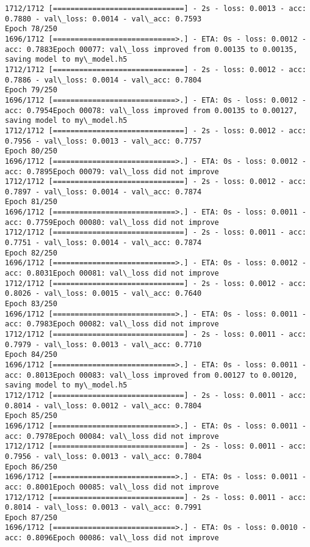 \documentclass[11pt]{article}
\begin{document}
\begin{Verbatim}[commandchars=\\\{\}]
1712/1712 [==============================] - 2s - loss: 0.0013 - acc: 0.7880 - val\_loss: 0.0014 - val\_acc: 0.7593
Epoch 78/250
1696/1712 [============================>.] - ETA: 0s - loss: 0.0012 - acc: 0.7883Epoch 00077: val\_loss improved from 0.00135 to 0.00135, saving model to my\_model.h5
1712/1712 [==============================] - 2s - loss: 0.0012 - acc: 0.7886 - val\_loss: 0.0014 - val\_acc: 0.7804
Epoch 79/250
1696/1712 [============================>.] - ETA: 0s - loss: 0.0012 - acc: 0.7954Epoch 00078: val\_loss improved from 0.00135 to 0.00127, saving model to my\_model.h5
1712/1712 [==============================] - 2s - loss: 0.0012 - acc: 0.7956 - val\_loss: 0.0013 - val\_acc: 0.7757
Epoch 80/250
1696/1712 [============================>.] - ETA: 0s - loss: 0.0012 - acc: 0.7895Epoch 00079: val\_loss did not improve
1712/1712 [==============================] - 2s - loss: 0.0012 - acc: 0.7897 - val\_loss: 0.0014 - val\_acc: 0.7874
Epoch 81/250
1696/1712 [============================>.] - ETA: 0s - loss: 0.0011 - acc: 0.7759Epoch 00080: val\_loss did not improve
1712/1712 [==============================] - 2s - loss: 0.0011 - acc: 0.7751 - val\_loss: 0.0014 - val\_acc: 0.7874
Epoch 82/250
1696/1712 [============================>.] - ETA: 0s - loss: 0.0012 - acc: 0.8031Epoch 00081: val\_loss did not improve
1712/1712 [==============================] - 2s - loss: 0.0012 - acc: 0.8026 - val\_loss: 0.0015 - val\_acc: 0.7640
Epoch 83/250
1696/1712 [============================>.] - ETA: 0s - loss: 0.0011 - acc: 0.7983Epoch 00082: val\_loss did not improve
1712/1712 [==============================] - 2s - loss: 0.0011 - acc: 0.7979 - val\_loss: 0.0013 - val\_acc: 0.7710
Epoch 84/250
1696/1712 [============================>.] - ETA: 0s - loss: 0.0011 - acc: 0.8013Epoch 00083: val\_loss improved from 0.00127 to 0.00120, saving model to my\_model.h5
1712/1712 [==============================] - 2s - loss: 0.0011 - acc: 0.8014 - val\_loss: 0.0012 - val\_acc: 0.7804
Epoch 85/250
1696/1712 [============================>.] - ETA: 0s - loss: 0.0011 - acc: 0.7978Epoch 00084: val\_loss did not improve
1712/1712 [==============================] - 2s - loss: 0.0011 - acc: 0.7956 - val\_loss: 0.0013 - val\_acc: 0.7804
Epoch 86/250
1696/1712 [============================>.] - ETA: 0s - loss: 0.0011 - acc: 0.8001Epoch 00085: val\_loss did not improve
1712/1712 [==============================] - 2s - loss: 0.0011 - acc: 0.8014 - val\_loss: 0.0013 - val\_acc: 0.7991
Epoch 87/250
1696/1712 [============================>.] - ETA: 0s - loss: 0.0010 - acc: 0.8096Epoch 00086: val\_loss did not improve

\end{Verbatim}
\end{document}
